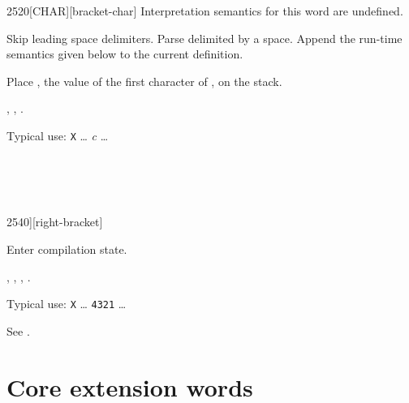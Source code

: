 \vspace*{-3ex}
\enlargethispage{6ex}
\begin{worddef}{2520}{[CHAR]}[bracket-char]
\interpret
	Interpretation semantics for this word are undefined.

\compile

	Skip leading space delimiters. Parse  delimited
	by a space. Append the run-time semantics given below to the
	current definition.

\runtime

	Place , the value of the first character of
	, on the stack.

\see {},
	,
	.

	\begin{rationale} %
		Typical use:
			\word{:} \texttt{X} {\ldots}
				\word{[CHAR]} \emph{c}
				{\ldots} \word{;}
	\end{rationale}

	\begin{testing} %
		 \\
		 \\
		 \\
	\end{testing}
\end{worddef}


\begin{worddef}{2540}{]}[right-bracket]
\item \stack{}{}

	Enter compilation state.

\see {},
	,
	\wref{core:[}{[},
	\rref{core:]}{}.

	\begin{rationale} %
		Typical use:
			\word{:} \texttt{X} {\ldots}
				\word{[} \texttt{4321} \word{]} 
				{\ldots} \word{;}
	\end{rationale}

	\begin{testing} %
		See \tref{core:[}{[}.
	\end{testing}
\end{worddef}


\section{Core extension words} %
\extended

